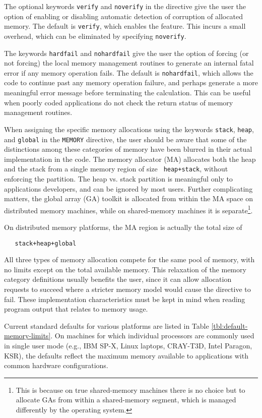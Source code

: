 The optional keywords \verb+verify+ and \verb+noverify+ in the
directive give the user the option of enabling or disabling automatic
detection of corruption of allocated memory.  The default is
\verb+verify+, which enables the feature. This incurs a small
overhead, which can be eliminated by specifying \verb+noverify+.

The keywords \verb+hardfail+ and \verb+nohardfail+ give the user the
option of forcing (or not forcing) the local memory management
routines to generate an internal fatal error if any memory operation
fails.  The default is \verb+nohardfail+, which allows the code to
continue past any memory operation failure, and perhaps generate a
more meaningful error message before terminating the calculation.
This can be useful when poorly coded applications do not check the
return status of memory management routines.

When assigning the specific memory allocations using the keywords
\verb+stack+, \verb+heap+, and \verb+global+ in the \verb+MEMORY+
directive, the user should be aware that some of the distinctions
among these categories of memory have been blurred in their actual
implementation in the code.  The memory allocator (MA) allocates both
the heap and the stack from a single memory region of size {\tt
  heap+stack}, without enforcing the partition.  The heap vs. stack
partition is meaningful only to applications developers, and can be
ignored by most users.  Further complicating matters, the global array
(GA) toolkit is allocated from within the MA space on distributed
memory machines, while on shared-memory machines it is
separate\footnote{This is because on true shared-memory machines there
  is no choice but to allocate GAs from within a shared-memory
  segment, which is managed differently by the operating system.}.

On distributed memory platforms, the MA region is actually the total
size of 
\begin{verbatim}
   stack+heap+global
\end{verbatim}
All three types of memory allocation
compete for the same pool of memory, with no limits except on the
total available memory.  This relaxation of the memory category
definitions usually benefits the user, since it can allow allocation
requests to succeed where a stricter memory model would cause the
directive to fail.  These implementation characteristics must be kept
in mind when reading program output that relates to memory usage.

Current standard defaults for various platforms are listed in Table
\ref{tbl:default-memory-limits}.  On machines for which individual
processors are commonly used in single user mode (e.g., IBM SP-X,
Linux laptops, CRAY-T3D, Intel Paragon, KSR), the defaults reflect
the maximum memory available to applications with common hardware
configurations.

